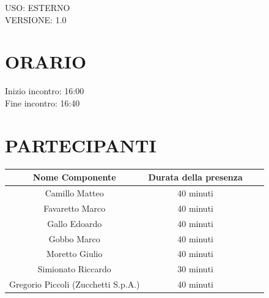 \documentclass[5pt]{article}
\begin{document}
\begin{flushright}
    \begin{spacing}{1}
        USO: ESTERNO\\
        VERSIONE: 1.0\\
    \end{spacing}
\end{flushright}


\restoregeometry

\pagebreak






\section{\Large ORARIO}
\begin{spacing}{1.5}
    {\large Inizio incontro: 16:00}\\
    {\large Fine incontro: 16:40}
\end{spacing}

\section{PARTECIPANTI}
\setlength\cellspacetoplimit{6pt}
\setlength\cellspacebottomlimit{6pt}

\begin{table}[ht]
  \begin{tabular}{|Sc|Sc|}
    \hline
    \textbf{Nome Componente} & \textbf{Durata della presenza} \\
    \hline
    Camillo Matteo & 40 minuti \\
    Favaretto Marco & 40 minuti \\
    Gallo Edoardo & 40 minuti \\
    Gobbo Marco & 40 minuti \\
    Moretto Giulio & 40 minuti \\
    Simionato Riccardo & 30 minuti \\
    Gregorio Piccoli (Zucchetti S.p.A.) & 40 minuti \\
    \hline
  \end{tabular}
  \label{tab:conference}
\end{table}
\end{document}
